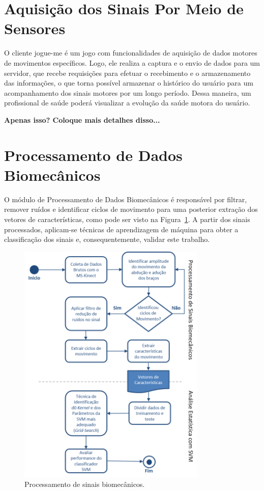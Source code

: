 \section{Aquisição dos Sinais Por Meio de Sensores}
O cliente \ac{jogue-me} é um jogo com funcionalidades de aquisição de dados motores de movimentos específicos. Logo, ele realiza a captura e o envio de dados para um servidor, que recebe requisições para efetuar o recebimento e o armazenamento das informações, o que torna possível armazenar o histórico do usuário para um acompanhamento dos sinais motores por um longo período. Dessa maneira, um profissional de saúde poderá visualizar a evolução da saúde motora do usuário.

\textbf{Apenas isso? Coloque mais detalhes disso...}

\section{Processamento de Dados Biomecânicos}\label{sec:processador_bio}
O módulo de Processamento de Dados Biomecânicos é responsável por filtrar, remover ruídos e identificar ciclos de movimento para uma posterior extração dos vetores de características, como pode ser visto na Figura~\ref{img:process_bio}. A partir dos sinais processados, aplicam-se técnicas de aprendizagem de máquina para obter a classificação dos sinais e, consequentemente, validar este trabalho.

\begin{figure}[!htb]
     \centering
     \includegraphics[width=0.8\textwidth]{./img/biomecprocessor2.png}
     \caption{Processamento de sinais biomecânicos.}
     \label{img:process_bio}
\end{figure}


